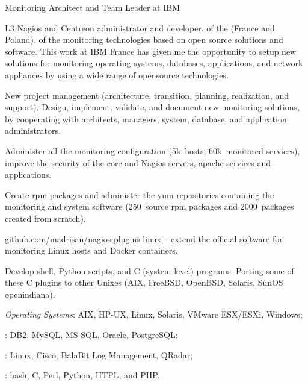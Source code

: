 
   {Monitoring Architect and Team Leader at IBM}

L3 Nagios and Centreon administrator and developer.
 of the 
(France and Poland).
 of the monitoring technologies based on open source
solutions and software.
This work at IBM France has given me the opportunity to setup new solutions 
for monitoring operating systems, databases, applications, and network 
appliances by using a wide range of opensource technologies.

\smallskip\noindent
\tasks
New project management
(architecture, transition, planning, realization, and support).
Design, implement, validate, and document new monitoring solutions,
by cooperating with architects, managers, system, database, and application 
administrators.

\tinyskip
Administer all the monitoring configuration
(5k\smallplus~hosts; 60k\smallplus~monitored services), improve the security
of the core and Nagios servers, apache services and applications.

\tinyskip
Create rpm packages and administer the yum repositories containing
the monitoring and system software (250\smallplus~source rpm packages and
2000~packages created from scratch).

\smallskip\noindent
\software
\url{github.com/madrisan/nagios-plugins-linux} --
extend the  official software for monitoring Linux
hosts and Docker containers.

Develop shell, Python scripts, and C (system level) programs.
Porting some of these C plugins to other Unixes
(AIX, FreeBSD, OpenBSD, Solaris, SunOS openindiana).

\tinyskip\noindent
\technologies
{\it Operating Systems\/}:
AIX, HP-UX, Linux, Solaris, VMware ESX/ESXi, Windows;
\par{}: DB2, MySQL, MS SQL, Oracle, PostgreSQL;
\par{}: Linux, Cisco,
BalaBit Log Management, QRadar;
\par{}: bash, C, Perl, Python, HTPL, and PHP.


